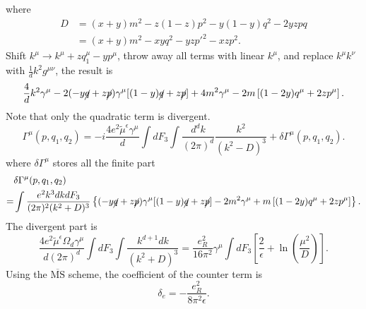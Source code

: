 where 
\begin{equation*}
\begin{aligned}
	D &= (x+y)m^2 - z(1-z)p^2- y(1-y)q^2-2yzpq \\
	&=(x+y)m^2 - xy q^2- yz p'^2 - xz p^2.
\end{aligned}
\end{equation*}
Shift $k^\mu \rightarrow k^\mu + z q_1^\mu - y p^\mu$, throw away all terms with linear $k^\mu$, and replace $k^\mu k^\nu$ with $\frac{1}{d}k^2 g^{\mu\nu}$, the result is
\begin{equation*}
	\frac{4}{d}k^2\gamma^\mu  -2(-y \cancel{q}+z \cancel{p}) \gamma^{\mu}[(1-y) \cancel q+z \cancel p] +4 m^{2} \gamma^{\mu}-2 m\left[(1-2 y) q^{\mu}+2 z p^{\mu}\right].
\end{equation*}
Note that only the quadratic term is divergent. 
\begin{equation*}
	\Gamma^\mu(p,q_1,q_2) = -i\frac{4e^2\tilde{\mu}^{\epsilon} \gamma^\mu}{d}  \int dF_3 \int \frac{d^dk}{(2\pi)^d} \frac{k^2}{(k^2-D)^3} + \delta\Gamma^\mu(p,q_1,q_2).
\end{equation*}
where $\delta \Gamma^\mu$ stores all the finite part
\begin{equation*}
\begin{aligned}
	& \delta\Gamma^\mu(p,q_1,q_2) \\
	=& \int \frac{e^2 k^3 dk dF_3}{(2\pi)^2(k^2+D)^3} \left\{(-y \cancel{q}+z \cancel{p}) \gamma^{\mu}[(1-y) \cancel q+z \cancel p] -2 m^{2} \gamma^{\mu}+ m\left[(1-2 y) q^{\mu}+2 z p^{\mu}\right]\right\}.
\end{aligned}
\end{equation*}
The divergent part is
\begin{equation*}
	\frac{4 e^2\tilde{\mu}^{\epsilon} \Omega_d \gamma^\mu}{d(2\pi)^d}\int dF_3 \int \frac{k^{d+1}dk}{(k^2+D)^3}
	= \frac{e_R^2}{16\pi^2} \gamma^\mu \int dF_3 \left[\frac{2}{\epsilon}+\ln\left(\frac{\mu^2}{D}\right)\right].
\end{equation*}
Using the $\overline{\mathrm{MS}}$ scheme, the coefficient of the counter term is
\begin{equation}
	\delta_e = -\frac{e_R^2}{8\pi^2\epsilon}.
\end{equation}


